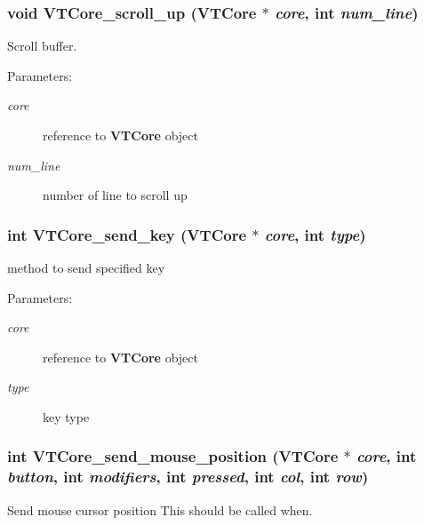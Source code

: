 \subsubsection{\setlength{\rightskip}{0pt plus 5cm}void VTCore\_\-scroll\_\-up ({\bf VTCore} $\ast$ {\em core}, int {\em num\_\-line})}\label{core_8h_a60}


Scroll buffer.

\begin{Desc}
\item[Parameters:]
\begin{description}
\item[{\em core}]reference to {\bf VTCore} object \item[{\em num\_\-line}]number of line to scroll up \end{description}
\end{Desc}
\subsubsection{\setlength{\rightskip}{0pt plus 5cm}int VTCore\_\-send\_\-key ({\bf VTCore} $\ast$ {\em core}, int {\em type})}\label{core_8h_a48}


method to send specified key

\begin{Desc}
\item[Parameters:]
\begin{description}
\item[{\em core}]reference to {\bf VTCore} object \item[{\em type}]key type \end{description}
\end{Desc}
\subsubsection{\setlength{\rightskip}{0pt plus 5cm}int VTCore\_\-send\_\-mouse\_\-position ({\bf VTCore} $\ast$ {\em core}, int {\em button}, int {\em modifiers}, int {\em pressed}, int {\em col}, int {\em row})}\label{core_8h_a62}


Send mouse cursor position This should be called when.

